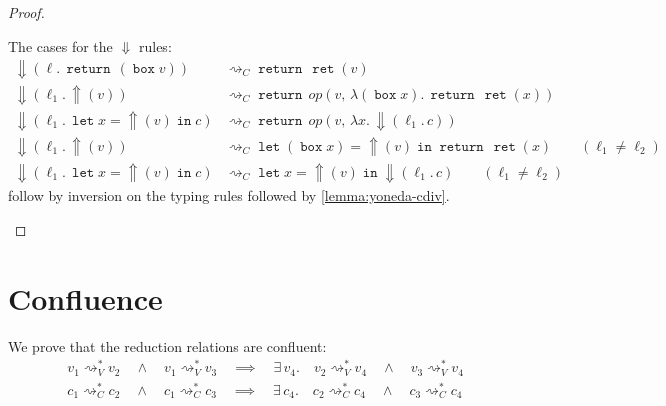 \documentclass[acmsmall, screen, review, anonymous]{acmart}
\theoremstyle{definition}
\newcommand{\reflectname}{\mathord{\Uparrow}}
\newcommand{\performraw}[2]{\mathop{\reflectname(#1(#2))}}
\newcommand{\perform}[3]{\performraw{#1}{#2}(#3)}
\newcommand{\reifyname}{\Downarrow}
\newcommand{\reify}[2]{\mathop{\reifyname}(#1.\,#2)}
\newcommand{\loc}{\ell}
\newcommand{\indintro}[3]{{#1}(#2,\, #3)}
\newcommand{\retname}{\mathtt{ret}}
\newcommand{\ret}[1]{\mathop{\retname}(#1)}
\newcommand{\abs}[2]{\lambda#1.\,#2}
\newcommand{\returnname}{\mathop{\mathtt{return}}}
\newcommand{\return}[1]{\returnname\, #1}
\newcommand{\letvname}{\mathop{\mathtt{let}}}
\newcommand{\letv}[3]{\letvname #1 = #2 \mathop{\mathtt{in}} #3}
\newcommand{\gboxname}{\mathop{\mathtt{box}}}
\newcommand{\gbox}[1]{\gboxname #1}
\newcommand{\stepstoname}{\rightsquigarrow}
\newcommand{\stepstoc}{\stepstoname_C}
\newcommand{\reducestoname}{\stepstoname^{*}}
\newcommand{\reducestov}{\reducestoname_{V}}
\newcommand{\reducestoc}{\reducestoname_{C}}
\begin{document}
\begin{proof}
\begin{description}
The cases for the $\reifyname$ rules:
\begin{align*}
\reify{\loc}{\return{(\gbox{v})}} &\stepstoc \return{\ret{v}} \\
\reify{\loc_1}{\perform{\loc_1}{op}{v}} &\stepstoc \return{\indintro{op}{v}{\abs{(\gbox{x})}{\return{\ret{x}}}}} \\
\reify{\loc_1}{\letv{x}{\perform{\loc_1}{op}{v}}{c}} &\stepstoc \return{\indintro{op}{v}{\abs{x}{\reify{\loc_1}{c}}}} \\
\reify{\loc_1}{\perform{\loc_2}{op}{v}} &\stepstoc \letv{(\gbox{x})}{\perform{\loc_2}{op}{v}}{\return{\ret{x}}} \qquad (\loc_1 \neq \loc_2) \\
\reify{\loc_1}{\letv{x}{\perform{\loc_2}{op}{v}}{c}} &\stepstoc \letv{x}{\perform{\loc_2}{op}{v}}{\reify{\loc_1}{c}} \qquad (\loc_1 \neq \loc_2)
\end{align*}
follow by inversion on the typing rules followed by \ref{lemma:yoneda-cdiv}.
\end{description}
\end{proof}

\section{Confluence}
\label{apdx:church-rosser}

We prove that the reduction relations are confluent:
\begin{align*}
  &v_1 \reducestov v_2
    \quad \wedge \quad v_1 \reducestov v_3
    \quad \implies \quad \exists\, v_4. \quad v_2 \reducestov v_4
    \quad \wedge \quad v_3 \reducestov v_4 \\
  &c_1 \reducestoc c_2
    \quad \wedge \quad c_1 \reducestoc c_3
    \quad \implies \quad \exists\, c_4. \quad c_2 \reducestoc c_4
    \quad \wedge \quad c_3 \reducestoc c_4
\end{align*}
\end{document}
